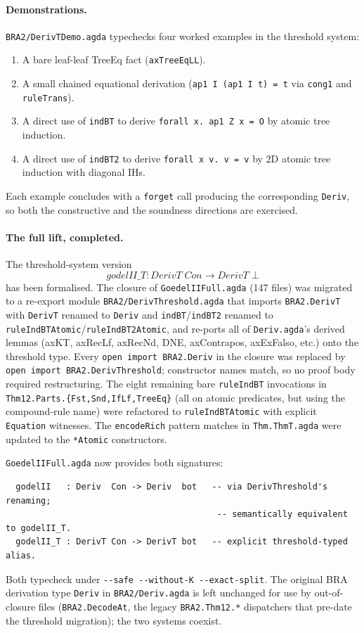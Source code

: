 \documentclass[11pt]{article}
\begin{document}
\paragraph{Demonstrations.}
\verb|BRA2/DerivTDemo.agda| typechecks four worked examples in the
threshold system:
\begin{enumerate}
  \item A bare leaf-leaf TreeEq fact (\verb|axTreeEqLL|).
  \item A small chained equational derivation
        (\verb|ap1 I (ap1 I t) = t| via \verb|cong1| and
        \verb|ruleTrans|).
  \item A direct use of \verb|indBT| to derive
        \verb|forall x. ap1 Z x = O| by atomic tree induction.
  \item A direct use of \verb|indBT2| to derive
        \verb|forall x v. v = v| by 2D atomic tree induction with
        diagonal IHs.
\end{enumerate}
Each example concludes with a
\verb|forget| call producing the corresponding \verb|Deriv|, so
both the constructive and the soundness directions are exercised.

\paragraph{The full lift, completed.}
The threshold-system version
\[
  \mathit{godelII\_T} : \mathit{DerivT}\;\mathit{Con} \to \mathit{DerivT}\;\bot
\]
has been formalised.  The closure of \verb|GoedelIIFull.agda| (147
files) was migrated to a re-export module \verb|BRA2/DerivThreshold.agda|
that imports \verb|BRA2.DerivT| with \verb|DerivT| renamed to
\verb|Deriv| and \verb|indBT|/\verb|indBT2| renamed to
\verb|ruleIndBTAtomic|/\verb|ruleIndBT2Atomic|, and re-ports all of
\verb|Deriv.agda|'s derived lemmas (axKT, axRecLf, axRecNd,
DNE, axContrapos, axExFalso, etc.) onto the threshold type.  Every
\verb|open import BRA2.Deriv| in the closure was replaced by
\verb|open import BRA2.DerivThreshold|; constructor names match, so
no proof body required restructuring.  The eight remaining bare
\verb|ruleIndBT| invocations in \verb|Thm12.Parts.{Fst,Snd,IfLf,TreeEq}|
(all on atomic predicates, but using the compound-rule name) were
refactored to \verb|ruleIndBTAtomic| with explicit \verb|Equation|
witnesses.  The \verb|encodeRich| pattern matches in
\verb|Thm.ThmT.agda| were updated to the \verb|*Atomic| constructors.

\verb|GoedelIIFull.agda| now provides both signatures:
\begin{verbatim}
  godelII   : Deriv  Con -> Deriv  bot   -- via DerivThreshold's renaming;
                                          -- semantically equivalent to godelII_T.
  godelII_T : DerivT Con -> DerivT bot   -- explicit threshold-typed alias.
\end{verbatim}
Both typecheck under \verb|--safe --without-K --exact-split|.  The
original BRA derivation type \verb|Deriv| in \verb|BRA2/Deriv.agda|
is left unchanged for use by out-of-closure files
(\verb|BRA2.DecodeAt|, the legacy \verb|BRA2.Thm12.*| dispatchers
that pre-date the threshold migration); the two systems coexist.
\end{document}

